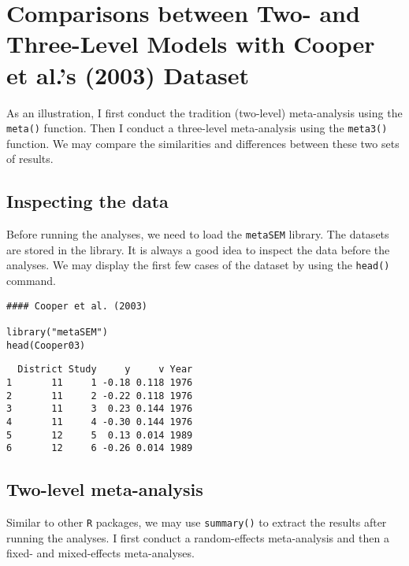\documentclass[11pt]{article}
\begin{document}
\section{Comparisons between Two- and Three-Level Models with Cooper et al.'s (2003) Dataset}
\label{sec:orgd68cc19}
As an illustration, I first conduct the tradition (two-level) meta-analysis using the \texttt{meta()} function. Then I conduct a three-level meta-analysis using the \texttt{meta3()} function. We may compare the similarities and differences between these two sets of results. 

\subsection{Inspecting the data}
\label{sec:org2e8dfbd}
Before running the analyses, we need to load the \texttt{metaSEM} library. The datasets are stored in the library. It is always a good idea to inspect the data before the analyses. We may display the first few cases of the dataset by using the \texttt{head()} command. 
\begin{verbatim}
#### Cooper et al. (2003)

library("metaSEM")
head(Cooper03)
\end{verbatim}

\begin{verbatim}
  District Study     y     v Year
1       11     1 -0.18 0.118 1976
2       11     2 -0.22 0.118 1976
3       11     3  0.23 0.144 1976
4       11     4 -0.30 0.144 1976
5       12     5  0.13 0.014 1989
6       12     6 -0.26 0.014 1989
\end{verbatim}

\subsection{Two-level meta-analysis}
\label{sec:org44c59c0}
Similar to other \texttt{R} packages, we may use \texttt{summary()} to extract the results after running the analyses. I first conduct a random-effects meta-analysis and then a fixed- and mixed-effects meta-analyses.
\end{document}
